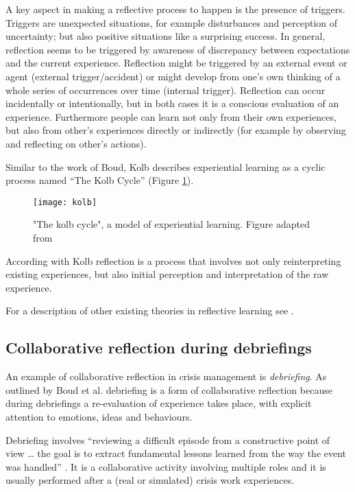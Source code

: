 A key aspect in making a reflective process to happen is the presence of triggers. Triggers are unexpected situations, for example disturbances and perception of uncertainty; but also positive situations like a surprising success. In general, reflection seems to be triggered by awareness of discrepancy between expectations and the current experience. Reflection might be triggered by an external event or agent (external trigger/accident) or might develop from one's own thinking of a whole series of occurrences over time (internal trigger). Reflection can occur incidentally or intentionally, but in both cases it is a conscious evaluation of an experience. Furthermore people can learn not only from their own experiences, but also from other's experiences directly or indirectly (for example by observing and reflecting on other's actions).

Similar to the work of Boud, Kolb describes experiential learning as a cyclic process named ``The Kolb Cycle'' (Figure \ref{fig:kolb-model}).

\begin{figure}
	[tbh] \centering 
	\texttt{[image: kolb]} \caption{"The kolb cycle", a model of experiential learning. Figure adapted from \protect\autocite{kolb1984organizational}} \label{fig:kolb-model} 
\end{figure}

According with Kolb \autocite*{kolb1984experiential} reflection is a process that involves not only reinterpreting existing experiences, but also initial perception and interpretation of the raw experience.

For a description of other existing theories in reflective learning see \autocite{WoodDaudelin199636}.

\subsection{Collaborative reflection during debriefings}\label{debriefing-crisis-management-work-an-example-of-collaborative-reflection}

An example of collaborative reflection in crisis management is \emph{debriefing}. As outlined by Boud et al. \autocite*{boud1985reflection} debriefing is a form of collaborative reflection because during debriefings a re-evaluation of experience takes place, with explicit attention to emotions, ideas and behaviours.

Debriefing involves ``reviewing a difficult episode from a constructive point of view \ldots{} the goal is to extract fundamental lessons learned from the way the event was handled'' \autocite{Lagadec:1997js}. It is a collaborative activity involving multiple roles and it is usually performed after a (real or simulated) crisis work experiences. 

